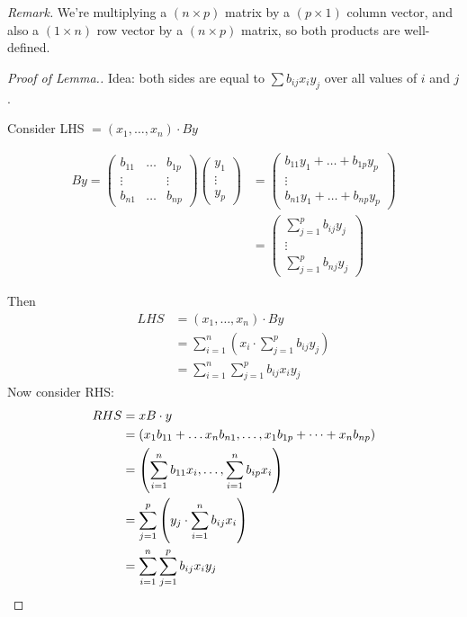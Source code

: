\documentclass[10pt]{scrartcl}
\begin{document}
\emph{Remark.} We're multiplying a $(n \times p)$ matrix by a $(p \times 1)$ column vector, and also a $(1\times n)$ row vector by a $(n \times p)$ matrix, so both products are well-defined. 
\begin{proof}[Proof of Lemma.]
Idea: both sides are equal to $\sum b_{ij}x_iy_j$ over all values of $i$ and $j$. 

Consider LHS $ = (x_1,\dots,x_n)\cdot By$


\begin{align*}
  By = \begin{pmatrix}
 b_{11} & \dots &  b_{1p}\\
 \vdots & & \vdots \\
 b_{n1} & \dots & b_{np}	
 \end{pmatrix}\begin{pmatrix}
y_1 \\\vdots \\ y_p	
\end{pmatrix} &= \begin{pmatrix}
 b_{11}y_1 + \dots + b_{1p}y_p\\
 \vdots\\
 b_{n1}y_1 + \dots + b_{np}y_p	
 \end{pmatrix}\\
 &= 
 \begin{pmatrix}
 \sum_{j=1}^p b_{ij}y_j\\
 \vdots\\
 \sum_{j=1}^p b_{nj}y_j	
 \end{pmatrix}
\end{align*}

Then \vspace*{-5pt}
\begin{align*}
  LHS &= (x_1,\dots,x_n) \cdot By\\
   &= \sum_{i=1}^n \left(x_i \cdot \sum_{j=1}^p b_{ij}y_j\right) \\
  &= \sum_{i=1}^n \sum_{j=1}^p b_{ij}x_iy_j
\end{align*}
Now consider RHS:
\begin{align*}
  RHS &= xB\cdot y\\
  &= (x_1b_{11} + \dots x_nb_{n1}, \dots, x_1b_{1p} + \dots + x_nb_{np})\\
  &= \left(\sum_{i=1}^n b_{11}x_i,\dots,\sum_{i=1}^nb_{ip}x_i\right)\\
&= \sum_{j=1}^p\left(y_j \cdot \sum_{i=1}^n b_{ij}x_i\right)\\
  &= \sum_{i=1}^n\sum_{j=1}^pb_{ij}x_iy_j\qedhere
\end{align*}
\end{proof}
\end{document}
